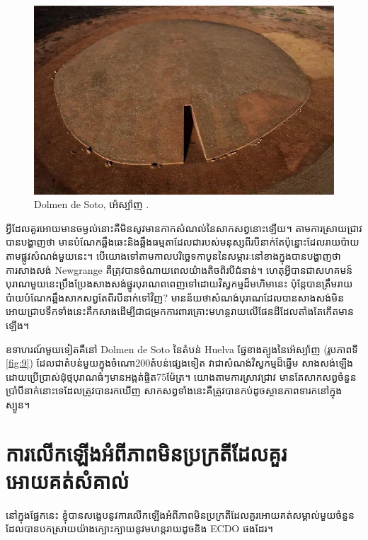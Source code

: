 \documentclass[10pt,twocolumn,letterpaper]{article}
\begin{document}
\begin{figure}[b]
\begin{center}
   \includegraphics[width=1\linewidth]{dolmen.jpg}
\end{center}
   \caption{Dolmen de Soto, អ៉េស្ប៉ាញ \cite{53}.}
\label{fig:9}
\label{fig:onecol}
\end{figure}

អ្វីដែលគួរអោយមានចម្ងល់នោះគឺមិនសូវមានកាកសំណល់នៃសាកសព្វនោះឡើយ។ តាមការស្រាយជ្រាវបានបង្ហាញថា មានបំណែកឆ្អឹងឆេះនិងឆ្អឹងធម្មតាដែលជារបស់មនុស្សពីរបីនាក់តែប៉ុន្នោះដែលរាយប៉ាយតាមផ្លូវសំណង់មួយនេះ។ បើយោងទៅតាមកាលបរិច្ឆេទកាបូននៃសម្ភារៈនៅខាងក្នុងបានបង្ហាញថា ការសាងសង់ Newgrange គឺត្រុវបានចំណាយពេលយ៉ាងតិចពិរបីជំនាន់។ ហេតុអ្វីបានជាសហគមន៍បុរាណមួយនេះប្រឹងប្រែងសាងសង់ផ្នូរបុរាណពពេញទៅដោយវិស្វកម្មដ៏មហិមានេះ ប៉ុន្តែបានត្រឹមរាយប៉ាយបំណែកឆ្អឹងសាកសព្វតែពីរបីនាក់ទៅវិញ? មានន័យថាសំណង់បុរាណដែលបានសាងសង់មិនអោយជ្រាបទឹកទាំងនេះគឺកសាងដើម្បីជាជម្រកការពារគ្រោះមហន្ថរាយលើផែនដីដែលតាំងតែកើតមានឡើង។

ឧទាហរណ៍មួយទៀតគឺនៅ Dolmen de Soto នៃតំបន់ Huelva ផ្នែខាងត្បូងនៃអ៉េស្ប៉ាញ (រូបភាពទី \ref{fig:9}) ដែលជាតំបន់មួយក្នុងចំណោ200តំបន់ផ្សេងទៀត \cite{72,32} វាជាសំណង់វិស្វកម្មដ៏ឆ្នើម សាងសង់ឡើងដោយប្រើប្រាស់ដុំថ្មបុរាណធំៗមានអង្កត់ផ្ចិត75ម៉ែត្រ។ យោងតាមការស្រាវជ្រាវ មានតែសាកសព្វចំនួនប្រាំបីនាក់នោះទេដែលត្រូវបានរកឃើញ សាកសព្វទាំងនេះគឺត្រូវបានកប់ដូចស្ថានភាពទារកនៅក្នុងស្បូន។

\section{ការលើកឡើងអំពីភាពមិនប្រក្រតីដែលគួរអោយគត់សំគាល់}

នៅក្នុងផ្នែកនេះ ខ្ញុំបានសង្ខេបនូវការលើកឡើងអំពីភាពមិនប្រក្រតីដែលគួរអោយគត់សម្គាល់មួយចំនួន ដែលបានបកស្រាយយ៉ាងក្បោះក្បាយនូវមហន្តរាយដូចនិង ECDO ផងដែរ។
\end{document}

